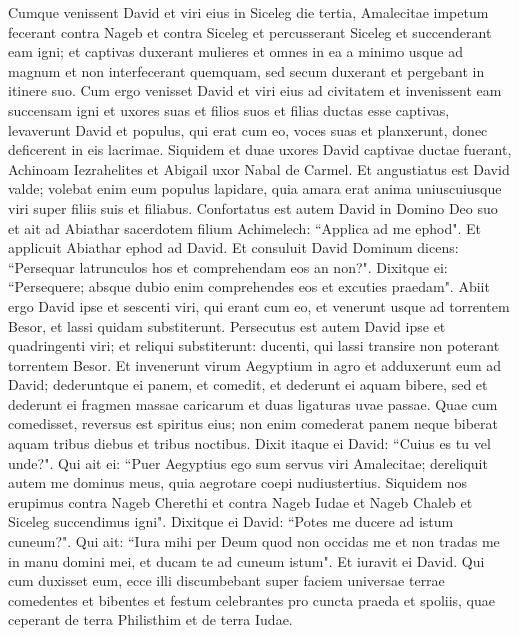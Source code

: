 \begin{biblechapter}  
\verse Cumque venissent David et viri eius in Siceleg die tertia, Amalecitae impetum fecerant contra Nageb et contra Siceleg et percusserant Siceleg et succenderant eam igni; 
\verse et captivas duxerant mulieres et omnes in ea a minimo usque ad magnum et non interfecerant quemquam, sed secum duxerant et pergebant in itinere suo. 
\verse Cum ergo venisset David et viri eius ad civitatem et invenissent eam succensam igni et uxores suas et filios suos et filias ductas esse captivas, 
\verse levaverunt David et populus, qui erat cum eo, voces suas et planxerunt, donec deficerent in eis lacrimae. 
\verse Siquidem et duae uxores David captivae ductae fuerant, Achinoam Iezrahelites et Abigail uxor Nabal de Carmel. 
\verse Et angustiatus est David valde; volebat enim eum populus lapidare, quia amara erat anima uniuscuiusque viri super filiis suis et filiabus. Confortatus est autem David in Domino Deo suo 
\verse et ait ad Abiathar sacerdotem filium Achimelech: “Applica ad me ephod". Et applicuit Abiathar ephod ad David. 
\verse Et consuluit David Dominum dicens: “Persequar latrunculos hos et comprehendam eos an non?". Dixitque ei: “Persequere; absque dubio enim comprehendes eos et excuties praedam". 
\verse Abiit ergo David ipse et sescenti viri, qui erant cum eo, et venerunt usque ad torrentem Besor, et lassi quidam substiterunt. 
\verse Persecutus est autem David ipse et quadringenti viri; et reliqui substiterunt: ducenti, qui lassi transire non poterant torrentem Besor. 
\verse Et invenerunt virum Aegyptium in agro et adduxerunt eum ad David; dederuntque ei panem, et comedit, et dederunt ei aquam bibere, 
\verse sed et dederunt ei fragmen massae caricarum et duas ligaturas uvae passae. Quae cum comedisset, reversus est spiritus eius; non enim comederat panem neque biberat aquam tribus diebus et tribus noctibus. 
\verse Dixit itaque ei David: “Cuius es tu vel unde?". Qui ait ei: “Puer Aegyptius ego sum servus viri Amalecitae; dereliquit autem me dominus meus, quia aegrotare coepi nudiustertius. 
\verse Siquidem nos erupimus contra Nageb Cherethi et contra Nageb Iudae et Nageb Chaleb et Siceleg succendimus igni". 
\verse Dixitque ei David: “Potes me ducere ad istum cuneum?". Qui ait: “Iura mihi per Deum quod non occidas me et non tradas me in manu domini mei, et ducam te ad cuneum istum". Et iuravit ei David. 
\verse Qui cum duxisset eum, ecce illi discumbebant super faciem universae terrae comedentes et bibentes et festum celebrantes pro cuncta praeda et spoliis, quae ceperant de terra Philisthim et de terra Iudae. 

\end{biblechapter}
